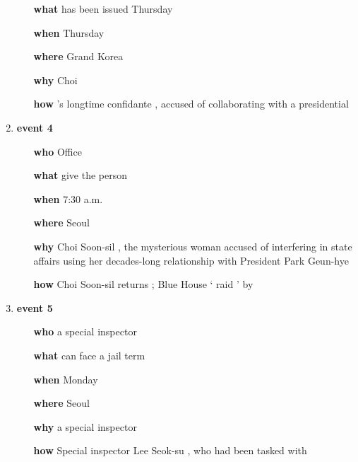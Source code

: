 \begin{enumerate}
\begin{enumerate}
\item[\textbf{	what	}]	has	been	issued	Thursday
\item[\textbf{	when	}]	Thursday
\item[\textbf{	where	}]	Grand	Korea
\item[\textbf{	why	}]	Choi
\item[\textbf{	how	}]	’s	longtime	confidante	,	accused	of	collaborating	with	a	presidential
\end{enumerate}
\item \textbf{	event		4	}
\begin{enumerate}
\item[\textbf{	who	}]	Office
\item[\textbf{	what	}]	give	the	person
\item[\textbf{	when	}]	7:30	a.m.
\item[\textbf{	where	}]	Seoul
\item[\textbf{	why	}]	Choi	Soon-sil	,	the	mysterious	woman	accused	of	interfering	in	state	affairs	using	her	decades-long	relationship	with	President	Park	Geun-hye
\item[\textbf{	how	}]	Choi	Soon-sil	returns	;	Blue	House	‘	raid	’	by
\end{enumerate}
\item \textbf{	event		5	}
\begin{enumerate}
\item[\textbf{	who	}]	a	special	inspector
\item[\textbf{	what	}]	can	face	a	jail	term
\item[\textbf{	when	}]	Monday
\item[\textbf{	where	}]	Seoul
\item[\textbf{	why	}]	a	special	inspector
\item[\textbf{	how	}]	Special	inspector	Lee	Seok-su	,	who	had	been	tasked	with
\end{enumerate}
\end{enumerate}


